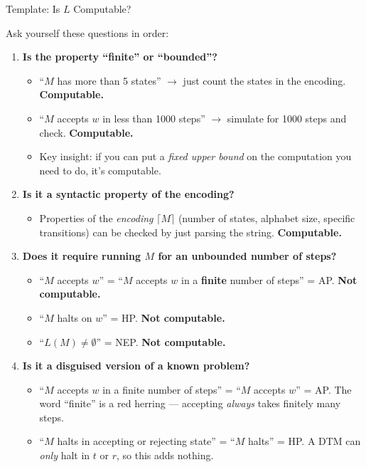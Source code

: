 \documentclass[11pt,a4paper]{article}
\begin{document}
\begin{templatebox}{Template: Is $L$ Computable?}

Ask yourself these questions in order:

\begin{enumerate}
    \item \textbf{Is the property ``finite'' or ``bounded''?}
    \begin{itemize}
        \item ``$M$ has more than 5 states'' $\to$ just count the states in the encoding. \textbf{Computable.}
        \item ``$M$ accepts $w$ in less than 1000 steps'' $\to$ simulate for 1000 steps and check. \textbf{Computable.}
        \item Key insight: if you can put a \emph{fixed upper bound} on the computation you need to do, it's computable.
    \end{itemize}

    \item \textbf{Is it a syntactic property of the encoding?}
    \begin{itemize}
        \item Properties of the \emph{encoding} $\lceil M \rceil$ (number of states, alphabet size, specific transitions) can be checked by just parsing the string. \textbf{Computable.}
    \end{itemize}

    \item \textbf{Does it require running $M$ for an unbounded number of steps?}
    \begin{itemize}
        \item ``$M$ accepts $w$'' = ``$M$ accepts $w$ in a \textbf{finite} number of steps'' = AP. \textbf{Not computable.}
        \item ``$M$ halts on $w$'' = HP. \textbf{Not computable.}
        \item ``$L(M) \neq \emptyset$'' = NEP. \textbf{Not computable.}
    \end{itemize}

    \item \textbf{Is it a disguised version of a known problem?}
    \begin{itemize}
        \item ``$M$ accepts $w$ in a finite number of steps'' = ``$M$ accepts $w$'' = AP. The word ``finite'' is a red herring --- accepting \emph{always} takes finitely many steps.
        \item ``$M$ halts in accepting or rejecting state'' = ``$M$ halts'' = HP. A DTM can \emph{only} halt in $t$ or $r$, so this adds nothing.
    \end{itemize}
\end{enumerate}
\end{templatebox}
\end{document}
